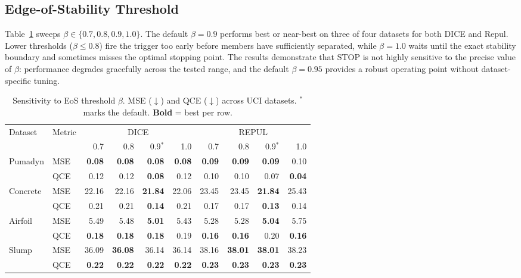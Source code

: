 \documentclass[sigconf]{acmart}
\begin{document}
\subsection{Edge-of-Stability Threshold}
\label{app:threshold}
Table~\ref{tab:sensitivity_tau} sweeps $\beta \in \{0.7, 0.8, 0.9, 1.0\}$. The default $\beta=0.9$ performs best or near-best on three of four datasets for both DICE and Repul. Lower thresholds ($\beta \leq 0.8$) fire the trigger too early before members have sufficiently separated, while $\beta=1.0$ waits until the exact stability boundary and sometimes misses the optimal stopping point. The results demonstrate that STOP is not highly sensitive to the precise value of $\beta$: performance degrades gracefully across the tested range, and the default $\beta=0.95$ provides a robust operating point without dataset-specific tuning.

\begin{table}[!ht]
\centering
\caption{Sensitivity to EoS threshold $\beta$. MSE ($\downarrow$) and QCE ($\downarrow$) across UCI datasets. $^*$ marks the default. \textbf{Bold} = best per row.}
\label{tab:sensitivity_tau}
\scriptsize
\setlength{\tabcolsep}{3pt}
\begin{tabular}{llrrrrrrrr}
\toprule
Dataset & Metric & \multicolumn{4}{c}{DICE} & \multicolumn{4}{c}{REPUL} \\
\cmidrule(lr){3-6} \cmidrule(lr){7-10}
& & 0.7 & 0.8 & 0.9$^*$ & 1.0 & 0.7 & 0.8 & 0.9$^*$ & 1.0 \\
\midrule
Pumadyn 
& MSE & \textbf{0.08} & \textbf{0.08} & \textbf{0.08} & \textbf{0.08} & \textbf{0.09} & \textbf{0.09} & \textbf{0.09} & 0.10 \\
& QCE & 0.12 & 0.12 & \textbf{0.08} & 0.12 & 0.10 & 0.10 & 0.07 & \textbf{0.04} \\
\midrule
Concrete 
& MSE & 22.16 & 22.16 & \textbf{21.84} & 22.06 & 23.45 & 23.45 & \textbf{21.84} & 25.43 \\
& QCE & 0.21 & 0.21 & \textbf{0.14} & 0.21 & 0.17 & 0.17 & \textbf{0.13} & 0.14 \\
\midrule
Airfoil 
& MSE & 5.49 & 5.48 & \textbf{5.01} & 5.43 & 5.28 & 5.28 & \textbf{5.04} & 5.75 \\
& QCE & \textbf{0.18} & \textbf{0.18} & \textbf{0.18} & 0.19 & \textbf{0.16} & \textbf{0.16} & 0.20 & \textbf{0.16} \\
\midrule
Slump 
& MSE & 36.09 & \textbf{36.08} & 36.14 & 36.14 & 38.16 & \textbf{38.01} & \textbf{38.01} & 38.23 \\
& QCE & \textbf{0.22} & \textbf{0.22} & \textbf{0.22} & \textbf{0.22} & \textbf{0.23} & \textbf{0.23} & \textbf{0.23} & \textbf{0.23} \\
\bottomrule
\end{tabular}
\end{table}
\end{document}
